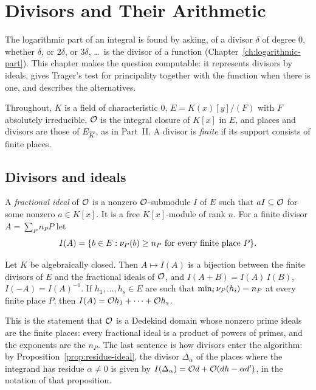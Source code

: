 \chapter{Divisors and Their Arithmetic}\label{ch:divisors}

The logarithmic part of an integral is found by asking, of a divisor
$\delta$ of degree $0$, whether $\delta$, or $2\delta$, or $3\delta$, \dots\
is the divisor of a function (Chapter~\ref{ch:logarithmic-part}). This
chapter makes the question computable: it represents divisors by ideals,
gives Trager's test for principality together with the function when there
is one, and describes the alternatives.

Throughout, $K$ is a field of characteristic $0$, $E = K(x)[y]/(F)$ with $F$
absolutely irreducible, $\mathcal{O}$ is the integral closure of $K[x]$ in $E$, and
places and divisors are those of $E_{\overline{K}}$, as in Part~II. A divisor is
\emph{finite} if its support consists of finite places.

\section{Divisors and ideals}\label{sec:div-ideals}

A \emph{fractional ideal} of $\mathcal{O}$ is a nonzero $\mathcal{O}$-submodule $I$ of $E$
such that $a I \subseteq \mathcal{O}$ for some nonzero $a \in K[x]$. It is a free
$K[x]$-module of rank $n$. For a finite divisor $A = \sum_P n_P P$ let
\[
  I(A) = \{ b \in E : \nu_{P}(b) \ge n_P \text{ for every finite place } P \} .
\]

\begin{theorem}\label{thm:divisor-ideal}
Let $K$ be algebraically closed. Then $A \mapsto I(A)$ is a bijection between
the finite divisors of $E$ and the fractional ideals of $\mathcal{O}$, and $I(A + B)
= I(A)\, I(B)$, $I(-A) = I(A)^{-1}$. If $h_1, \dots, h_s \in E$ are such that
$\min_i \nu_{P}(h_i) = n_P$ at every finite place $P$, then $I(A) = \mathcal{O} h_1 +
\dots + \mathcal{O} h_s$.
\end{theorem}

This is the statement that $\mathcal{O}$ is a Dedekind domain whose nonzero prime
ideals are the finite places: every fractional ideal is a product of powers
of primes, and the exponents are the $n_P$. The last sentence is how
divisors enter the algorithm: by Proposition~\ref{prop:residue-ideal}, the
divisor $\Delta_\alpha$ of the places where the integrand has residue
$\alpha \ne 0$ is given by $I(\Delta_\alpha) = \mathcal{O} d + \mathcal{O} (dh - \alpha d')$, in
the notation of that proposition.

